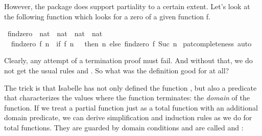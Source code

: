 \begin{isabellebody}
\begin{isamarkuptext}
  However, the  package does support partiality to a
  certain extent. Let's look at the following function which looks
  for a zero of a given function f.%
\end{isamarkuptext}%
\isamarkuptrue%
\isamarkupfalse%
\ findzero\ {}{}\ {}{}nat\ {}\ nat{}\ {}\ nat\ {}\ nat{}\isanewline
{}\isanewline
\ \ {}findzero\ f\ n\ {}\ {}if\ f\ n\ {}\ {}\ then\ n\ else\ findzero\ f\ {}Suc\ n{}{}{}\isanewline
%
\isadelimproof
%
\endisadelimproof
%
\isatagproof
{}\isamarkupfalse%
\ pat{}completeness\ auto%
\endisatagproof
{\isafoldproof}%
%
\isadelimproof
%
\endisadelimproof
%
\begin{isamarkuptext}%
\noindent Clearly, any attempt of a termination proof must fail. And without
  that, we do not get the usual rules  and 
  . So what was the definition good for at all?%
\end{isamarkuptext}%
\isamarkuptrue%
%
\isamarkuptrue%
%
\begin{isamarkuptext}%
The trick is that Isabelle has not only defined the function , but also
  a predicate  that characterizes the values where the function
  terminates: the \emph{domain} of the function. If we treat a
  partial function just as a total function with an additional domain
  predicate, we can derive simplification and
  induction rules as we do for total functions. They are guarded
  by domain conditions and are called  and :%
\end{isamarkuptext}%
\isamarkuptrue%
%
\begin{isamarkuptext}%
\noindent\begin{minipage}{0.79\textwidth}\begin{isabelle}%

\end{isabelle}
\end{minipage}
\end{isamarkuptext}
\end{isabellebody}
